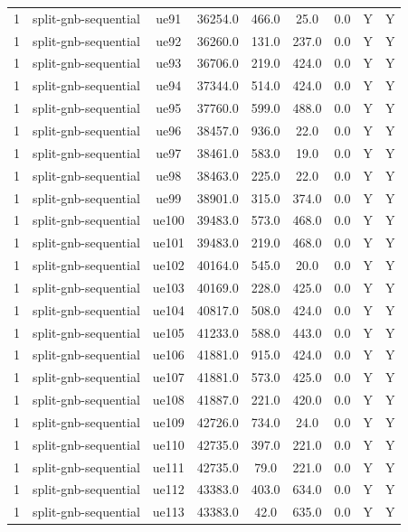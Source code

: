 \begin{table}[ht]
\begin{tabular}{|c|c|c|c|c|c|c|c|c|}
1 & split-gnb-sequential & ue91 & 36254.0 & 466.0 & 25.0 & 0.0 & Y & Y \\
1 & split-gnb-sequential & ue92 & 36260.0 & 131.0 & 237.0 & 0.0 & Y & Y \\
1 & split-gnb-sequential & ue93 & 36706.0 & 219.0 & 424.0 & 0.0 & Y & Y \\
1 & split-gnb-sequential & ue94 & 37344.0 & 514.0 & 424.0 & 0.0 & Y & Y \\
1 & split-gnb-sequential & ue95 & 37760.0 & 599.0 & 488.0 & 0.0 & Y & Y \\
1 & split-gnb-sequential & ue96 & 38457.0 & 936.0 & 22.0 & 0.0 & Y & Y \\
1 & split-gnb-sequential & ue97 & 38461.0 & 583.0 & 19.0 & 0.0 & Y & Y \\
1 & split-gnb-sequential & ue98 & 38463.0 & 225.0 & 22.0 & 0.0 & Y & Y \\
1 & split-gnb-sequential & ue99 & 38901.0 & 315.0 & 374.0 & 0.0 & Y & Y \\
1 & split-gnb-sequential & ue100 & 39483.0 & 573.0 & 468.0 & 0.0 & Y & Y \\
1 & split-gnb-sequential & ue101 & 39483.0 & 219.0 & 468.0 & 0.0 & Y & Y \\
1 & split-gnb-sequential & ue102 & 40164.0 & 545.0 & 20.0 & 0.0 & Y & Y \\
1 & split-gnb-sequential & ue103 & 40169.0 & 228.0 & 425.0 & 0.0 & Y & Y \\
1 & split-gnb-sequential & ue104 & 40817.0 & 508.0 & 424.0 & 0.0 & Y & Y \\
1 & split-gnb-sequential & ue105 & 41233.0 & 588.0 & 443.0 & 0.0 & Y & Y \\
1 & split-gnb-sequential & ue106 & 41881.0 & 915.0 & 424.0 & 0.0 & Y & Y \\
1 & split-gnb-sequential & ue107 & 41881.0 & 573.0 & 425.0 & 0.0 & Y & Y \\
1 & split-gnb-sequential & ue108 & 41887.0 & 221.0 & 420.0 & 0.0 & Y & Y \\
1 & split-gnb-sequential & ue109 & 42726.0 & 734.0 & 24.0 & 0.0 & Y & Y \\
1 & split-gnb-sequential & ue110 & 42735.0 & 397.0 & 221.0 & 0.0 & Y & Y \\
1 & split-gnb-sequential & ue111 & 42735.0 & 79.0 & 221.0 & 0.0 & Y & Y \\
1 & split-gnb-sequential & ue112 & 43383.0 & 403.0 & 634.0 & 0.0 & Y & Y \\
1 & split-gnb-sequential & ue113 & 43383.0 & 42.0 & 635.0 & 0.0 & Y & Y \\

\end{tabular}
\end{table}
